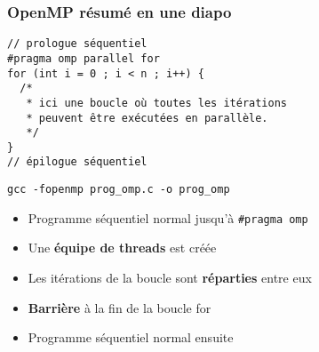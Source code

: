 \documentclass{beamer}
\begin{document}

\begin{frame}[fragile]
  \frametitle{OpenMP résumé en une diapo}

  \begin{framed}
    \begin{verbatim}
// prologue séquentiel
#pragma omp parallel for
for (int i = 0 ; i < n ; i++) {
  /*
   * ici une boucle où toutes les itérations
   * peuvent être exécutées en parallèle.
   */
}
// épilogue séquentiel
\end{verbatim}
\end{framed}

\texttt{gcc \alert{-fopenmp} prog\_omp.c -o prog\_omp}

\medskip

\begin{itemize}
\item Programme séquentiel \og normal\fg{} jusqu'à \texttt{\#pragma omp}
\item Une \textbf{équipe de threads} est créée
\item Les itérations de la boucle sont \textbf{réparties} entre eux
\item \textbf{Barrière} à la fin de la boucle for
\item Programme séquentiel \og normal\fg{} ensuite
\end{itemize}

\end{frame}








\end{document}
